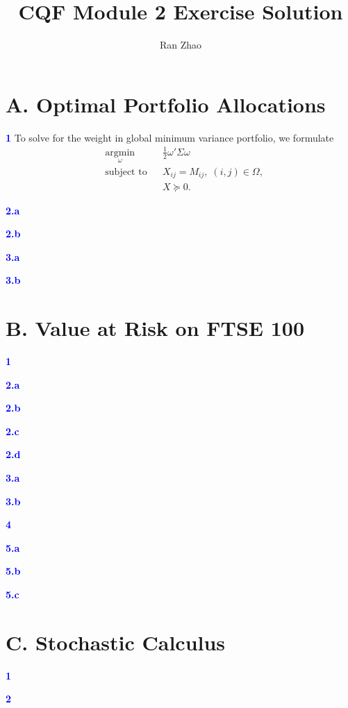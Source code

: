 \documentclass[a4paper,11pt] {article}
\author{Ran Zhao}
\title{CQF Module 2 Exercise Solution}
\date{}
\begin{document}
\maketitle


\section*{A. Optimal Portfolio Allocations}
\textcolor{blue}{\bf 1 } To solve for the weight in global minimum variance portfolio, we formulate 
\begin{equation*}
\begin{aligned}
& \underset{\omega}{\text{argmin}} & & \frac{1}{2}\omega'\Sigma\omega \\
& \text{subject to} 
& & X_{ij} = M_{ij}, \; (i,j) \in \Omega, \\
&&& X \succeq 0.
\end{aligned}
\end{equation*}

\textcolor{blue}{\bf 2.a }

\textcolor{blue}{\bf 2.b }

\textcolor{blue}{\bf 3.a }

\textcolor{blue}{\bf 3.b }

\section*{B. Value at Risk on FTSE 100}
\textcolor{blue}{\bf 1 }

\textcolor{blue}{\bf 2.a }

\textcolor{blue}{\bf 2.b }

\textcolor{blue}{\bf 2.c }

\textcolor{blue}{\bf 2.d }

\textcolor{blue}{\bf 3.a }

\textcolor{blue}{\bf 3.b }

\textcolor{blue}{\bf 4 }

\textcolor{blue}{\bf 5.a }

\textcolor{blue}{\bf 5.b }

\textcolor{blue}{\bf 5.c }

\section*{C. Stochastic Calculus}
\textcolor{blue}{\bf 1 }

\textcolor{blue}{\bf 2}
\end{document}
